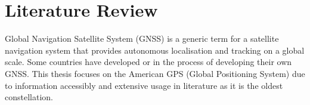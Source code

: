 
\def\chapdir{./ChapterLiteratureReview}

\chapter{Literature Review} \label{ch:litreview}





Global Navigation Satellite System (GNSS) is a generic term for a satellite navigation system that provides autonomous localisation and tracking on a global scale. Some countries have developed or in the process of developing their own GNSS. This thesis focuses on the American GPS (Global Positioning System) due to information accessibly and extensive usage in literature as it is the oldest constellation.

